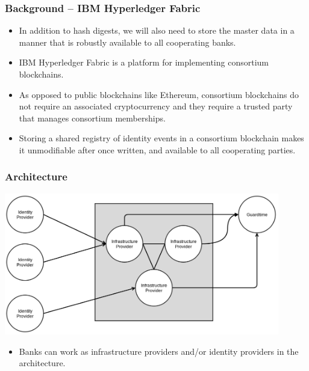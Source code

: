\documentclass[8pt]{beamer}
\begin{document}
\begin{frame}
\frametitle{Background – IBM Hyperledger Fabric}

\begin{itemize}
 \item In addition to hash digests, we will also need to store the master data in a manner that is robustly available to all cooperating banks.
 \item IBM Hyperledger Fabric is a platform for implementing consortium blockchains.
 \item As opposed to public blockchains like Ethereum, consortium blockchains do not require an associated cryptocurrency and they require a trusted party that manages consortium memberships.
 \item Storing a shared registry of identity events in a consortium blockchain makes it unmodifiable after once written, and available to all cooperating parties.
\end{itemize}

\end{frame}

\begin{frame}
\frametitle{Architecture}

\includegraphics[width=0.9\textwidth]{./deployment.png}

\begin{itemize}
 \item Banks can work as infrastructure providers and/or identity providers in the architecture.
\end{itemize}

\end{frame}
\end{document}
